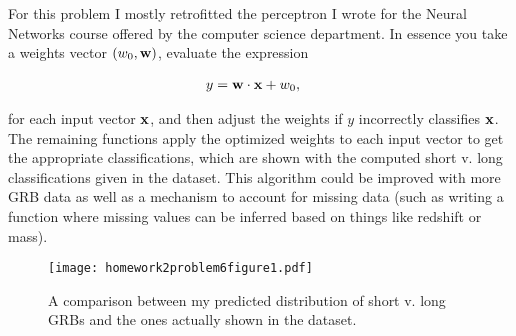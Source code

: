 For this problem I mostly retrofitted the perceptron I wrote for the Neural Networks course offered by the computer science department. In essence you take a weights vector $(w_{0}, \mathbf{w})$, evaluate the expression

\begin{align}
y &= \mathbf{w}\cdot{\mathbf{x}} + w_{0},
\end{align}

for each input vector $\mathbf{x}$, and then adjust the weights if $y$ incorrectly classifies $\mathbf{x}$. The remaining functions apply the optimized weights to each input vector to get the appropriate classifications, which are shown with the computed short v. long classifications given in the dataset. This algorithm could be improved with more GRB data as well as a mechanism to account for missing data (such as writing a function where missing values can be inferred based on things like redshift or mass).



\clearpage

\begin{figure}[h]
    \centering
    \texttt{[image: homework2problem6figure1.pdf]}
    \caption{A comparison between my predicted distribution of short v. long GRBs and the ones actually shown in the dataset.}
    \label{fig:261}
\end{figure}

\clearpage
